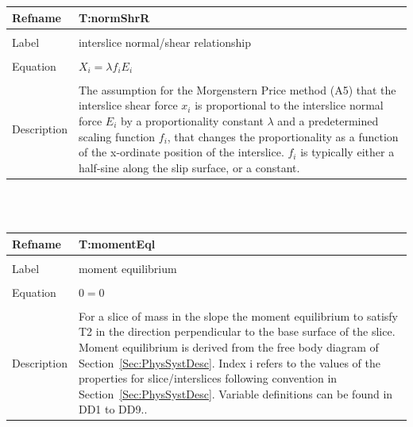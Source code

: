 \documentclass[12pt]{article}
\begin{document}
\noindent \begin{minipage}{\textwidth}
\begin{tabular}{p{} p{}}
\toprule \textbf{Refname} & \textbf{T:normShrR}
\label{T:normShrR}
\\ \midrule \\
Label & interslice normal/shear relationship
\\ \midrule \\
Equation & $X_{i}=\lambda{}f_{i}E_{i}$
\\ \midrule \\
Description & The assumption for the Morgenstern Price method (A5) that the interslice shear force $x_{i}$ is proportional to the interslice normal force $E_{i}$ by a proportionality constant $\lambda{}$ and a predetermined scaling function $f_{i}$, that changes the proportionality as a function of the x-ordinate position of the interslice. $f_{i}$ is typically either a half-sine along the slip surface, or a constant.
\\ \bottomrule \end{tabular}
\end{minipage}\\
~\newline
\noindent \begin{minipage}{\textwidth}
\begin{tabular}{p{} p{}}
\toprule \textbf{Refname} & \textbf{T:momentEql}
\label{T:momentEql}
\\ \midrule \\
Label & moment equilibrium
\\ \midrule \\
Equation & $0=0$
\\ \midrule \\
Description & For a slice of mass in the slope the moment equilibrium to satisfy T2 in the direction perpendicular to the base surface of the slice. Moment equilibrium is derived from the free body diagram of Section~\ref{Sec:PhysSystDesc}. Index i refers to the values of the properties for slice/interslices following convention in Section~\ref{Sec:PhysSystDesc}. Variable definitions can be found in DD1 to DD9..
\\ \bottomrule \end{tabular}
\end{minipage}\\
~\newline
\end{document}
